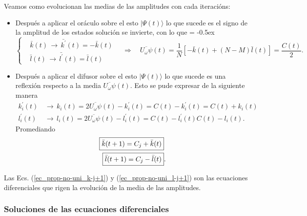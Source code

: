 \documentclass[a4paper,11pt]{article} %
\numberwithin{equation}{section}
\def\lc{\left[}
\def\rc{\right]}
\def\lch{\left\{}
\def\rqa{\quad \Rightarrow \quad}
\begin{document}
Veamos como evolucionan las medias de las amplitudes con cada iteracións:
\begin{itemize}
	\item Después a aplicar el oráculo sobre el esto $|\Psi(t) \rangle$ lo que sucede es el signo de la amplitud de los estados solución se invierte, con lo que 
{
\extrarowheight = -0.5ex
\renewcommand{\arraystretch}{1.75}
\begin{equation*}
\lch \begin{matrix} 
	& \bar{k}(t) \, \rightarrow \, \bar{k^{'}}(t) = -\bar{k}(t) \\
	& \bar{l}(t) \, \rightarrow \, \bar{l^{'}}(t) = \bar{l}(t)
\end{matrix} \right.
\rqa
\overline{U_\omega \psi}(t) = \frac{1}{N} \lc - \bar{k}(t) + (N-M) \bar{l}(t) \rc = \frac{C(t)}{2}.
\end{equation*}
}
	
	\item Después a aplicar el difusor sobre el esto $|\Psi(t) \rangle$ lo que sucede es una reflexión respecto a la media $\overline{U_\omega \psi}(t)$. Esto se pude expresar de la siguiente manera
\begin{align}
{k}^{'}_i(t) \, & \rightarrow \, {k}_i(t) = 2 \overline{U_\omega \psi}(t) - {k}^{'}_i(t) =  C(t) - k^{'}_i(t) = C(t) + k_i(t) \label{ec_prop-no-uni_k-j+1_i} \\
{l}^{'}_i(t) \, & \rightarrow \, {l}_i(t) = 2 \overline{U_\omega \psi}(t) - {l}^{'}_i(t) = C(t) - l^{'}_i(t) C(t) - l_i(t). \label{ec_prop-no-uni_l-j+1_i} 
\end{align}
Promediando
\begin{align}
\Aboxed{\bar{k}(t+1) = C_j + \bar{k}(t) } \label{ec_prop-no-uni_k-j+1} \\
\Aboxed{\bar{l}(t+1) = C_j - \bar{l}(t)}.  \label{ec_prop-no-uni_l-j+1} 
\end{align}
\end{itemize}
Las Ecs. (\ref{ec_prop-no-uni_k-j+1}) y (\ref{ec_prop-no-uni_l-j+1}) son las ecuaciones diferenciales que rigen la evolución de la media de las amplitudes.


\subsubsection{Soluciones de las ecuaciones diferenciales} \label{subsec_prop-no-uni_ecuaciones-diff-sol}
\end{document}

